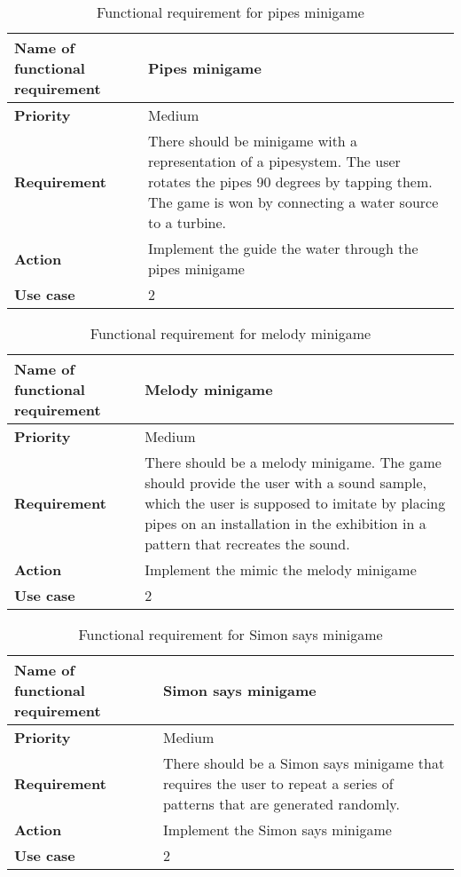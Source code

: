 \begin{table}[!h]
\caption{Functional requirement for pipes minigame}
\begin{tabular}{ |p{7cm}|p{7cm}| }
\hline
\textbf {Name of functional requirement} & {Pipes minigame} \\ \hline
\textbf {Priority} & {Medium} \\ \hline
\textbf {Requirement} & {There should be minigame with a representation of a pipesystem. The user rotates the pipes 90 degrees by tapping them. The game is won by connecting a water source to a turbine.} \\ \hline
\textbf {Action} & {Implement the guide the water through the pipes minigame} \\ \hline
\textbf {Use case} & {2} \\ \hline
\end{tabular}
\end{table}

\begin{table}[!h]
\caption{Functional requirement for melody minigame}
\begin{tabular}{ |p{7cm}|p{7cm}| }
\hline
\textbf {Name of functional requirement} & {Melody minigame} \\ \hline
\textbf {Priority} & {Medium} \\ \hline
\textbf {Requirement} & {There should be a melody minigame. The game should provide the user with a sound sample, which the user is supposed to imitate by placing pipes on an installation in the exhibition in a pattern that recreates the sound.} \\ \hline
\textbf {Action} & {Implement the mimic the melody minigame} \\ \hline
\textbf {Use case} & {2} \\ \hline
\end{tabular}
\end{table}

\begin{table}[!h]
\caption{Functional requirement for Simon says minigame}
\begin{tabular}{ |p{7cm}|p{7cm}| }
\hline
\textbf {Name of functional requirement} & {Simon says minigame} \\ \hline
\textbf {Priority} & {Medium} \\ \hline
\textbf {Requirement} & {There should be a Simon says minigame that requires the user to repeat a series of patterns that are generated randomly.} \\ \hline
\textbf {Action} & {Implement the Simon says minigame} \\ \hline
\textbf {Use case} & {2} \\ \hline
\end{tabular}
\end{table}

